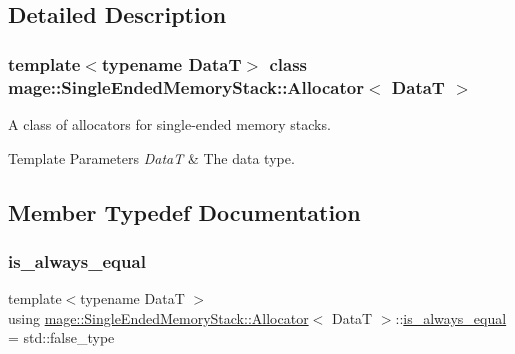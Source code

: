 \subsection{Detailed Description}
\subsubsection*{template$<$typename DataT$>$\newline
class mage\+::\+Single\+Ended\+Memory\+Stack\+::\+Allocator$<$ Data\+T $>$}

A class of allocators for single-\/ended memory stacks.


\begin{DoxyTemplParams}{Template Parameters}
{\em DataT} & The data type. \\
\hline
\end{DoxyTemplParams}


\subsection{Member Typedef Documentation}
\hypertarget{classmage_1_1_single_ended_memory_stack_1_1_allocator_a64d005be12e9d1749c0e6eeea5107a98}{}\label{classmage_1_1_single_ended_memory_stack_1_1_allocator_a64d005be12e9d1749c0e6eeea5107a98} 
\subsubsection{\texorpdfstring{is\+\_\+always\+\_\+equal}{is\_always\_equal}}
{\footnotesize\ttfamily template$<$typename DataT $>$ \\
using \hyperlink{classmage_1_1_single_ended_memory_stack_1_1_allocator}{mage\+::\+Single\+Ended\+Memory\+Stack\+::\+Allocator}$<$ DataT $>$\+::\hyperlink{classmage_1_1_single_ended_memory_stack_1_1_allocator_a64d005be12e9d1749c0e6eeea5107a98}{is\+\_\+always\+\_\+equal} =  std\+::false\+\_\+type}

\hypertarget{classmage_1_1_single_ended_memory_stack_1_1_allocator_a408c0a4b29dc60e9564245c6a0a6fd4c}{}\label{classmage_1_1_single_ended_memory_stack_1_1_allocator_a408c0a4b29dc60e9564245c6a0a6fd4c} 
